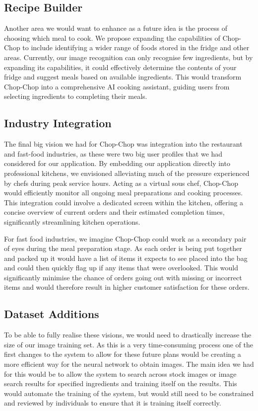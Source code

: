 \documentclass{article}
\begin{document}
\subsection{Recipe Builder}
Another area we would want to enhance as a future idea is the process of
choosing which meal to cook. We propose expanding the capabilities of Chop-Chop
to include identifying a wider range of foods stored in the fridge and other
areas. Currently, our image recognition can only recognise few ingredients, but
by expanding its capabilities, it could effectively determine the contents of
your fridge and suggest meals based on available ingredients. This would
transform Chop-Chop into a comprehensive AI cooking assistant, guiding users
from selecting ingredients to completing their meals.
\subsection{Industry Integration}
The final big vision we had for Chop-Chop was integration into the restaurant
and fast-food industries, as these were two big user profiles that we had
considered for our application. By embedding our application directly into
professional kitchens, we envisioned alleviating much of the pressure
experienced by chefs during peak service hours. Acting as a virtual sous chef,
Chop-Chop would efficiently monitor all ongoing meal preparations and cooking
processes. This integration could involve a dedicated screen within the
kitchen, offering a concise overview of current orders and their estimated
completion times, significantly streamlining kitchen operations.

For fast food industries, we imagine Chop-Chop could work as a secondary pair
of eyes during the meal preparation stage. As each order is being put together
and packed up it would have a list of items it expects to see placed into the
bag and could then quickly flag up if any items that were overlooked. This
would significantly minimise the chance of orders going out with missing or
incorrect items and would therefore result in higher customer satisfaction for
these orders.

\subsection{Dataset Additions}
To be able to fully realise these visions, we would need to drastically
increase the size of our image training set. As this is a very time-consuming
process one of the first changes to the system to allow for these future plans
would be creating a more efficient way for the neural network to obtain images.
The main idea we had for this would be to allow the system to search across
stock images or image search results for specified ingredients and training
itself on the results. This would automate the training of the system, but
would still need to be constrained and reviewed by individuals to ensure that
it is training itself correctly.
\end{document}
